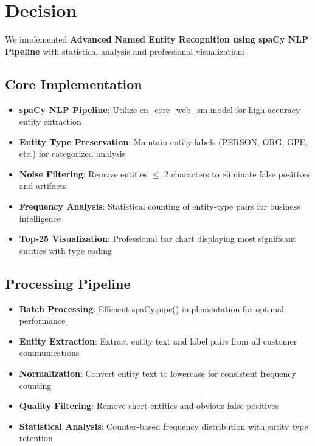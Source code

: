 \documentclass[11pt]{article}
\begin{document}
\section{Decision}

We implemented \textbf{Advanced Named Entity Recognition using spaCy NLP Pipeline} with statistical analysis and professional visualization:

\subsection{Core Implementation}
\begin{itemize}
\item \textbf{spaCy NLP Pipeline}: Utilize en\_core\_web\_sm model for high-accuracy entity extraction
\item \textbf{Entity Type Preservation}: Maintain entity labels (PERSON, ORG, GPE, etc.) for categorized analysis
\item \textbf{Noise Filtering}: Remove entities $\leq$ 2 characters to eliminate false positives and artifacts
\item \textbf{Frequency Analysis}: Statistical counting of entity-type pairs for business intelligence
\item \textbf{Top-25 Visualization}: Professional bar chart displaying most significant entities with type coding
\end{itemize}

\subsection{Processing Pipeline}
\begin{itemize}
\item \textbf{Batch Processing}: Efficient spaCy.pipe() implementation for optimal performance
\item \textbf{Entity Extraction}: Extract entity text and label pairs from all customer communications
\item \textbf{Normalization}: Convert entity text to lowercase for consistent frequency counting
\item \textbf{Quality Filtering}: Remove short entities and obvious false positives
\item \textbf{Statistical Analysis}: Counter-based frequency distribution with entity type retention
\end{itemize}
\end{document}
